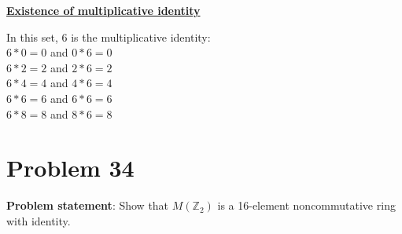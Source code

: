 \documentclass{article} %
\begin{document}
\begin{addmargin}[1em]{0em}
\underline{\textbf{Existence of multiplicative identity}}
\begin{addmargin}[1em]{0em}
In this set, $6$ is the multiplicative identity:
\\ $ 6 * 0 = 0$ and $0 * 6 = 0$
\\ $ 6 * 2 = 2$ and $2 * 6 = 2$
\\ $ 6 * 4 = 4$ and $4 * 6 = 4$
\\ $ 6 * 6 = 6$ and $6 * 6 = 6$
\\ $ 6 * 8 = 8$ and $8 * 6 = 8$
\end{addmargin}

\end{addmargin}

\newpage

\section*{Problem 34}


\textbf{Problem statement}: Show that $M(\mathbb{Z}_2)$ is a 16-element noncommutative ring with identity.
\\
\end{document}

